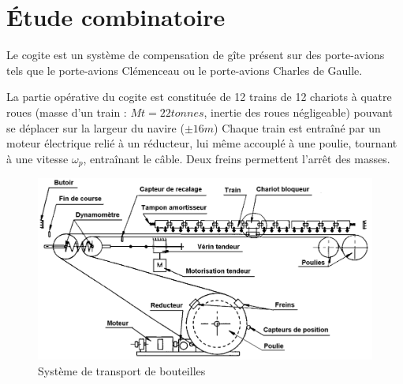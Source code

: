 
\section{Étude combinatoire}

Le cogite est un système de compensation de gîte présent sur des porte-avions tels que le porte-avions Clémenceau ou le porte-avions Charles de Gaulle.

La partie opérative du cogite est constituée de 12 trains de 12 chariots à quatre roues (masse d'un train : $Mt = 22 tonnes$, inertie des roues négligeable) pouvant se déplacer sur la largeur du navire ($\pm 16m$)
Chaque train est entraîné par un moteur électrique relié à un réducteur, lui même accouplé à une poulie, tournant à une vitesse $\omega_p$, entraînant le câble. Deux freins permettent l'arrêt des masses.

\begin{figure}[!h]
\begin{center}
	\includegraphics[width=0.8\linewidth]{img/fig09}
\end{center}
\caption{Système de transport de bouteilles}
\label{fig09}
\end{figure} 

